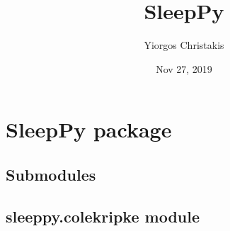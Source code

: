 \documentclass[letterpaper,10pt,english]{sphinxmanual}
\title{SleepPy}
\date{Nov 27, 2019}
\author{Yiorgos Christakis}
\begin{document}
\pagestyle{empty}
\sphinxmaketitle
\pagestyle{plain}
\sphinxtableofcontents
\pagestyle{normal}
\label{\detokenize{index::doc}}



\chapter{SleepPy package}
\label{\detokenize{index:sleeppy-package}}

\section{Submodules}
\label{\detokenize{index:submodules}}

\section{sleeppy.colekripke module}
\label{\detokenize{index:module-sleeppy.colekripke}}\label{\detokenize{index:sleeppy-colekripke-module}}
\end{document}
